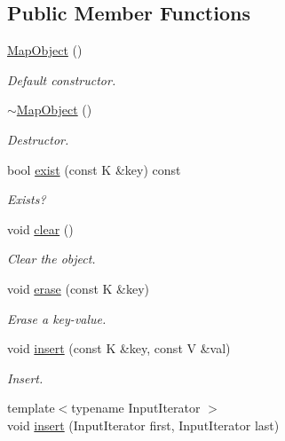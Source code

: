 \subsection*{Public Member Functions}
\begin{DoxyCompactItemize}
\item 
\mbox{\hyperlink{classADAT_1_1MapObject_a27943eb119ceceef215cf8d638da096e}{Map\+Object}} ()
\begin{DoxyCompactList}\small\item\em Default constructor. \end{DoxyCompactList}\item 
\mbox{\hyperlink{classADAT_1_1MapObject_a11fc724ec76293a4ae1ae98aa5032dfd}{$\sim$\+Map\+Object}} ()
\begin{DoxyCompactList}\small\item\em Destructor. \end{DoxyCompactList}\item 
bool \mbox{\hyperlink{classADAT_1_1MapObject_a1d22f979e34bda97c3dc89d5fc937d3b}{exist}} (const K \&key) const
\begin{DoxyCompactList}\small\item\em Exists? \end{DoxyCompactList}\item 
void \mbox{\hyperlink{classADAT_1_1MapObject_ad4a8a70a7c12d4bdc488d6eac20388a1}{clear}} ()
\begin{DoxyCompactList}\small\item\em Clear the object. \end{DoxyCompactList}\item 
void \mbox{\hyperlink{classADAT_1_1MapObject_aa93bbf650a37c70e91904c9e7566eb6f}{erase}} (const K \&key)
\begin{DoxyCompactList}\small\item\em Erase a key-\/value. \end{DoxyCompactList}\item 
void \mbox{\hyperlink{classADAT_1_1MapObject_a5389738841dca1228aefe6935c464a78}{insert}} (const K \&key, const V \&val)
\begin{DoxyCompactList}\small\item\em Insert. \end{DoxyCompactList}\item 
{\footnotesize template$<$typename Input\+Iterator $>$ }\\void \mbox{\hyperlink{classADAT_1_1MapObject_a151aa826b6db5cd124ed13f4a293da2b}{insert}} (Input\+Iterator first, Input\+Iterator last)

\end{DoxyCompactItemize}
